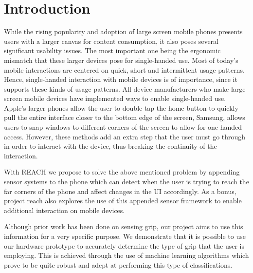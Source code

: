 \section{Introduction}
While the rising popularity and adoption of large screen mobile phones presents users with a larger canvas for content consumption, it also poses several significant usability issues. The most important one being the ergonomic mismatch that these larger devices pose for single-handed use. Most of today's mobile interactions are centered on quick, short and intermittent usage patterns. Hence, single-handed interaction with mobile devices is of importance, since it supports these kinds of usage patterns. All device manufacturers who make large screen mobile devices have implemented ways to enable single-handed use. Apple's larger phones allow the user to double tap the home button to quickly pull the entire interface closer to the bottom edge of the screen, Samsung, allows users to snap windows to different corners of the screen to allow for one handed access. However, these methods add an extra step that the user must go through in order to interact with the device, thus breaking the continuity of the interaction.
\par
With REACH we propose to solve the above mentioned problem by appending sensor systems to the phone which can detect when the user is trying to reach the far corners of the phone and affect changes in the UI accordingly. As a bonus, project reach also explores the use of this appended sensor framework to enable additional interaction on mobile devices.
\par
Although prior work has been done on sensing grip, our project aims to use this information for a very specific purpose. We demonstrate that it is possible to use our hardware prototype to accurately determine the type of grip that the user is employing. This is achieved through the use of machine learning algorithms which prove to be quite robust and adept at performing this type of classifications.
